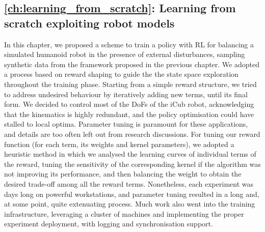 \subsection*{\autoref{ch:learning_from_scratch}: Learning from scratch exploiting robot models}

In this chapter, we proposed a scheme to train a policy with \ac{RL} for balancing a simulated humanoid robot in the presence of external disturbances, sampling synthetic data from the framework proposed in the previous chapter.
We adopted a process based on reward shaping to guide the the state space exploration throughout the training phase.
Starting from a simple reward structure, we tried to address undesired behaviour by iteratively adding new terms, until its final form.
We decided to control most of the \acp{DoF} of the iCub robot, acknowledging that the kinematics is highly redundant, and the policy optimisation could have stalled to local optima.
Parameter tuning is paramount for these applications, and details are too often left out from research discussions.
For tuning our reward function (for each term, its weights and kernel parameters), we adopted a heuristic method in which we analysed the learning curves of individual terms of the reward, tuning the sensitivity of the corresponding kernel if the algorithm was not improving its performance, and then balancing the weight to obtain the desired trade-off among all the reward terms.
Nonetheless, each experiment was days long on powerful workstations, and parameter tuning resulted in a long and, at some point, quite extenuating process.
Much work also went into the training infrastructure, leveraging a cluster of machines and implementing the proper experiment deployment, with logging and synchronisation support.

